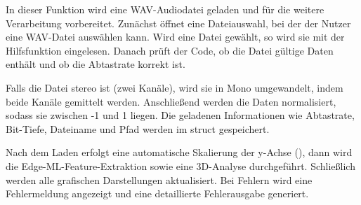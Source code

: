 In dieser Funktion wird eine WAV-Audiodatei geladen und für die weitere Verarbeitung vorbereitet. Zunächst öffnet eine Dateiauswahl, bei der der Nutzer eine WAV-Datei auswählen kann. Wird eine Datei gewählt, so wird sie mit der Hilfsfunktion  eingelesen. Danach prüft der Code, ob die Datei gültige Daten enthält und ob die Abtastrate korrekt ist.

Falls die Datei stereo ist (zwei Kanäle), wird sie in Mono umgewandelt, indem beide Kanäle gemittelt werden. Anschließend werden die Daten normalisiert, sodass sie zwischen -1 und 1 liegen. Die geladenen Informationen wie Abtastrate, Bit-Tiefe, Dateiname und Pfad werden im struct  gespeichert.

Nach dem Laden erfolgt eine automatische Skalierung der y-Achse (), dann wird die Edge-ML-Feature-Extraktion sowie eine 3D-Analyse durchgeführt. Schließlich werden alle grafischen Darstellungen aktualisiert. Bei Fehlern wird eine Fehlermeldung angezeigt und eine detaillierte Fehlerausgabe generiert. \cite{Hossain:2025} \cite{MathWorks:2025RaspberryPiAudio}

